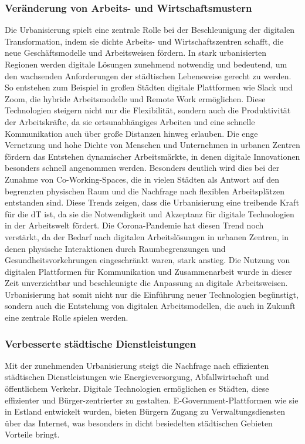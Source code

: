 \documentclass[conference,compsoc,final,a4paper, onecolumn, 11pt]{IEEEtran}
\begin{document}
\subsubsection{Veränderung von Arbeits- und Wirtschaftsmustern}
Die Urbanisierung spielt eine zentrale Rolle bei der Beschleunigung der digitalen Transformation, indem sie dichte Arbeits- und Wirtschaftszentren schafft, die neue Geschäftsmodelle und Arbeitsweisen fördern. 
In stark urbanisierten Regionen werden digitale Lösungen zunehmend notwendig und bedeutend, um den wachsenden Anforderungen der städtischen Lebensweise gerecht zu werden. 
So entstehen zum Beispiel in großen Städten digitale Plattformen wie Slack und Zoom, die hybride Arbeitsmodelle und Remote Work ermöglichen. 
Diese Technologien steigern nicht nur die Flexibilität, sondern auch die Produktivität der Arbeitskräfte, da sie ortsunabhängiges Arbeiten und eine schnelle Kommunikation auch über große Distanzen hinweg erlauben.
Die enge Vernetzung und hohe Dichte von Menschen und Unternehmen in urbanen Zentren fördern das Entstehen dynamischer Arbeitsmärkte, in denen digitale Innovationen besonders schnell angenommen werden. 
Besonders deutlich wird dies bei der Zunahme von Co-Working-Spaces, die in vielen Städten als Antwort auf den begrenzten physischen Raum und die Nachfrage nach flexiblen Arbeitsplätzen entstanden sind. 
Diese Trends zeigen, dass die Urbanisierung eine treibende Kraft für die \ac{dT} ist, da sie die Notwendigkeit und Akzeptanz für digitale Technologien in der Arbeitswelt fördert.
Die Corona-Pandemie hat diesen Trend noch verstärkt, da der Bedarf nach digitalen Arbeitslösungen in urbanen Zentren, in denen physische Interaktionen durch Raumbegrenzungen und Gesundheitsvorkehrungen eingeschränkt waren, stark anstieg. 
Die Nutzung von digitalen Plattformen für Kommunikation und Zusammenarbeit wurde in dieser Zeit unverzichtbar und beschleunigte die Anpassung an digitale Arbeitsweisen. 
Urbanisierung hat somit nicht nur die Einführung neuer Technologien begünstigt, sondern auch die Entstehung von digitalen Arbeitsmodellen, die auch in Zukunft eine zentrale Rolle spielen werden. \autocite{sustainability_digital_2023}


\subsubsection{ Verbesserte städtische Dienstleistungen}
Mit der zunehmenden Urbanisierung steigt die Nachfrage nach effizienten städtischen Dienstleistungen wie Energieversorgung, Abfallwirtschaft und öffentlichem Verkehr. 
Digitale Technologien ermöglichen es Städten, diese effizienter und Bürger-zentrierter zu gestalten. 
E-Government-Plattformen wie sie in Estland entwickelt wurden, bieten Bürgern Zugang zu Verwaltungsdiensten über das Internet, was besonders in dicht besiedelten städtischen Gebieten Vorteile bringt. \autocite{un_habitat_world_2022}
\end{document}

